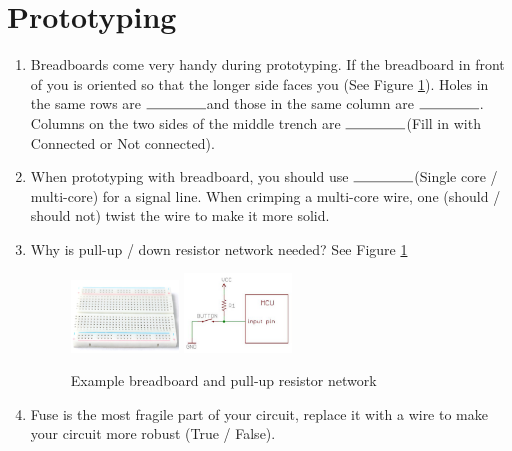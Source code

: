 \documentclass{article}
\newcommand{\ans}{$\rule{1.5cm}{0.15mm}$}
\begin{document}
\section{Prototyping}
\begin{enumerate}
	\item Breadboards come very handy during prototyping. If the breadboard in front of you is oriented so that the longer side faces you (See Figure \ref{fig:bread}). Holes in the same rows are \ans and those in the same column are \ans. Columns on the two sides of the middle trench are \ans (Fill in with Connected or Not connected). 
	\item When prototyping with breadboard, you should use \ans (Single core / multi-core) for a signal line. When crimping a multi-core wire, one (should / should not) twist the wire to make it more solid. 
	\item Why is pull-up / down resistor network needed? See Figure \ref{fig:bread}
	\begin{figure}[!h]
		\center
		\includegraphics[width=0.27\textwidth, keepaspectratio]{bread}
		\includegraphics[width=0.27\textwidth, keepaspectratio]{pull}
		\caption{Example breadboard and pull-up resistor network}
		\label{fig:bread}
	\end{figure}
	\item Fuse is the most fragile part of your circuit, replace it with a wire to make your circuit more robust (True / False).
\end{enumerate}
\end{document}
